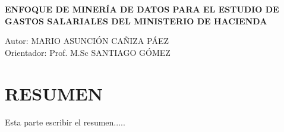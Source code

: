 \newpage
\begin{large}
	\centering \textbf{ENFOQUE DE MINER\'IA DE DATOS PARA EL ESTUDIO DE 	 GASTOS SALARIALES DEL MINISTERIO DE HACIENDA} \\
\end{large}
\begin{flushright}
	Autor: MARIO ASUNCI\'ON CAÑIZA P\'AEZ\\
    Orientador: Prof. M.Sc SANTIAGO G\'OMEZ
\end{flushright}
\vspace{1,5cm}
\section*{RESUMEN}
Esta parte escribir el resumen.....